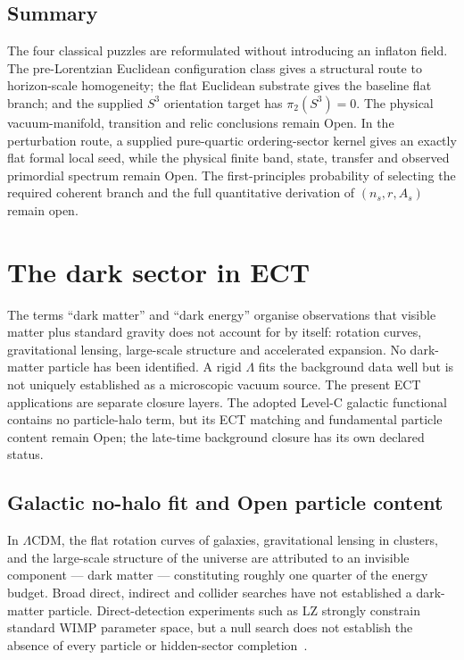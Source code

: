 \documentclass[11pt,a4paper]{article}
\begin{document}
\subsection{Summary}

The four classical puzzles are reformulated without introducing an inflaton
field.  The pre-Lorentzian Euclidean configuration class gives a structural route to
horizon-scale homogeneity; the flat Euclidean substrate gives the baseline
flat branch; and the supplied $S^3$ orientation target has $\pi_2(S^3)=0$.
The physical vacuum-manifold, transition and relic conclusions remain Open. In the
perturbation route, a supplied pure-quartic ordering-sector kernel gives an
exactly flat formal local seed, while the physical finite band, state,
transfer and observed primordial spectrum remain Open.  The first-principles
probability of selecting the required coherent branch and the full
quantitative derivation of $(n_s,r,A_s)$ remain open.


\section{The dark sector in ECT}
\label{sec:pop_dark}

The terms ``dark matter'' and ``dark energy'' organise observations that
visible matter plus standard gravity does not account for by itself: rotation
curves, gravitational lensing, large-scale structure and accelerated
expansion.  No dark-matter particle has been identified.  A rigid $\Lambda$
fits the background data well but is not uniquely established as a
microscopic vacuum source.  The present ECT applications are separate closure
layers.  The adopted Level-C galactic functional contains no particle-halo
term, but its ECT matching and fundamental particle content remain Open; the
late-time background closure has its own declared status.

\subsection{Galactic no-halo fit and Open particle content}

In $\Lambda$CDM, the flat rotation curves of galaxies, gravitational lensing in clusters, and the large-scale structure of the universe are attributed to an invisible component --- dark matter --- constituting roughly one quarter of the energy budget.  Broad direct, indirect and collider searches have not established a dark-matter particle.  Direct-detection experiments such as LZ strongly constrain standard WIMP parameter space, but a null search does not establish the absence of every particle or hidden-sector completion~\cite{LZ2023,ParticleDataGroup2022}.
\end{document}
